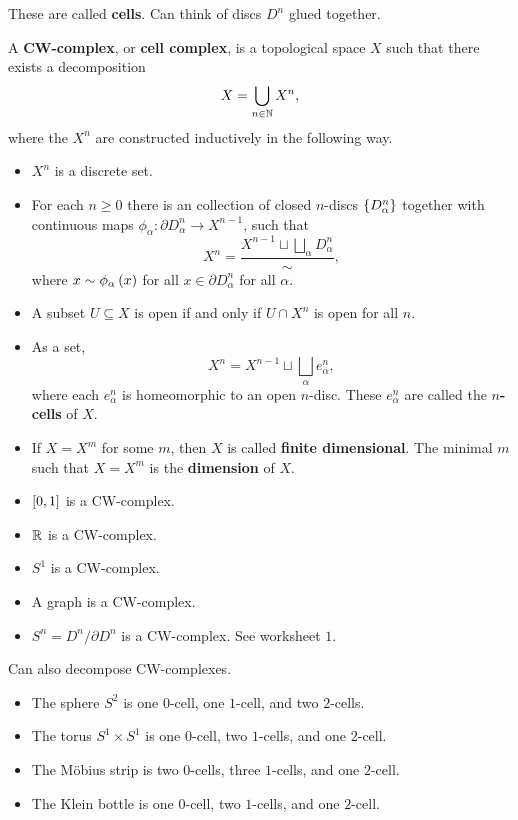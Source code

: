 These are called \textbf{cells}. Can think of discs $ D^n $ glued together.


\begin{definition*}
A \textbf{CW-complex}, or \textbf{cell complex}, is a topological space $ X $ such that there exists a decomposition
$$ X = \bigcup_{n \in \N} X^n, $$
where the $ X^n $ are constructed inductively in the following way.
\begin{itemize}
\item $ X^n $ is a discrete set.
\item For each $ n \ge 0 $ there is an collection of closed $ n $-discs $ \cb{D_\alpha^n} $ together with continuous maps $ \phi_\alpha : \partial D_\alpha^n \to X^{n - 1} $, such that
$$ X^n = \dfrac{X^{n - 1} \sqcup \bigsqcup_\alpha D_\alpha^n}{\sim}, $$
where $ x \sim \phi_\alpha\rb{x} $ for all $ x \in \partial D_\alpha^n $ for all $ \alpha $.
\item A subset $ U \subseteq X $ is open if and only if $ U \cap X^n $ is open for all $ n $.
\end{itemize}
\end{definition*}

\begin{remark*}
\hfill
\begin{itemize}
\item As a set,
$$ X^n = X^{n - 1} \sqcup \bigsqcup_\alpha e_\alpha^n, $$
where each $ e_\alpha^n $ is homeomorphic to an open $ n $-disc. These $ e_\alpha^n $ are called the \textbf{$ n $-cells} of $ X $.
\item If $ X = X^m $ for some $ m $, then $ X $ is called \textbf{finite dimensional}. The minimal $ m $ such that $ X = X^m $ is the \textbf{dimension} of $ X $.
\end{itemize}
\end{remark*}

\begin{example*}
\hfill
\begin{itemize}
\item $ \sb{0, 1} $ is a CW-complex.
\item $ \R $ is a CW-complex.
\item $ S^1 $ is a CW-complex.
\item A graph is a CW-complex.
\item $ S^n = D^n / \partial D^n $ is a CW-complex. See worksheet $ 1 $.
\end{itemize}
Can also decompose CW-complexes.
\begin{itemize}
\item The sphere $ S^2 $ is one $ 0 $-cell, one $ 1 $-cell, and two $ 2 $-cells.
\item The torus $ S^1 \times S^1 $ is one $ 0 $-cell, two $ 1 $-cells, and one $ 2 $-cell.
\item The M\"obius strip is two $ 0 $-cells, three $ 1 $-cells, and one $ 2 $-cell.
\item The Klein bottle is one $ 0 $-cell, two $ 1 $-cells, and one $ 2 $-cell.
\end{itemize}
\end{example*}

